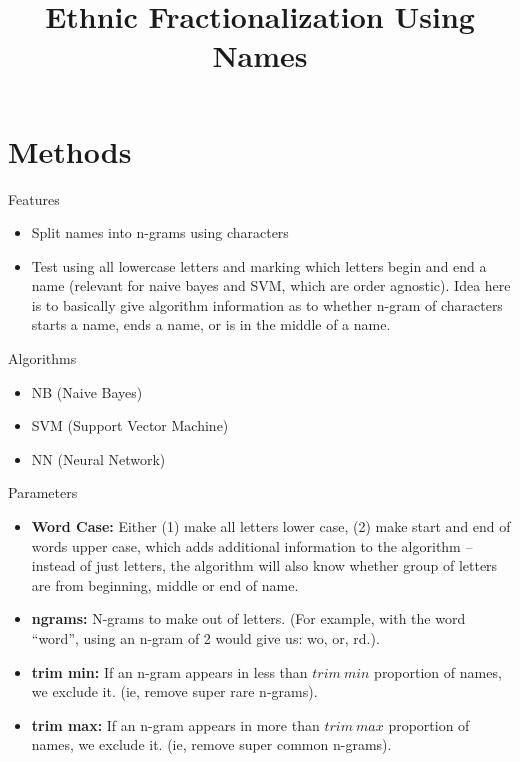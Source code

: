 \documentclass[11pt, oneside]{article}
\title{Ethnic Fractionalization Using Names}
\author{}
\date{}
\begin{document}
\maketitle



\section{Methods}

\noindent Features
\begin{itemize}
\item Split names into n-grams using characters
\item Test using all lowercase letters and marking which letters begin and end a name (relevant for naive bayes and SVM, which are order agnostic). Idea here is to basically give algorithm information as to whether n-gram of characters starts a name, ends a name, or is in the middle of a name.
\end{itemize}

\noindent Algorithms
\begin{itemize}
\item NB (Naive Bayes)
\item SVM (Support Vector Machine)
\item NN (Neural Network)
\end{itemize}

\noindent Parameters
\begin{itemize}
\item {\bf Word Case:} Either (1) make all letters lower case, (2) make start and end of words upper case, which adds additional information to the algorithm -- instead of just letters, the algorithm will also know whether group of letters are from beginning, middle or end of name.
\item {\bf ngrams:} N-grams to make out of letters. (For example, with the word ``word'', using an n-gram of 2 would give us: wo, or, rd.).
\item {\bf trim min:} If an n-gram appears in less than $trim~min$ proportion of names, we exclude it. (ie, remove super rare n-grams).
\item {\bf trim max:} If an n-gram appears in more than $trim~max$ proportion of names, we exclude it. (ie, remove super common n-grams).
\end{itemize}
\end{document}
